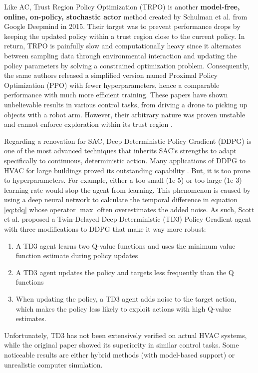 \documentclass[../main.tex]{subfiles}
\begin{document}
Like AC, Trust Region Policy Optimization (TRPO) is another \textbf{model-free, online, on-policy, stochastic actor} method created by Schulman et al. \cite{schulman2015trust} from Google Deepmind in 2015. Their target was to prevent performance drops by keeping the updated policy within a trust region close to the current policy. In return, TRPO is painfully slow and computationally heavy since it alternates between sampling data through environmental interaction and updating the policy parameters by solving a constrained optimization problem. Consequently, the same authors released a simplified version named Proximal Policy Optimization (PPO) \cite{schulman2017proximal} with fewer hyperparameters, hence a comparable performance with much more efficient training. These papers have shown unbelievable results in various control tasks, from driving a drone to picking up objects with a robot arm. However, their arbitrary nature was proven unstable and cannot enforce exploration within its trust region \cite{wang2020truly}.

Regarding a renovation for SAC, Deep Deterministic Policy Gradient (DDPG) \cite{lillicrap2019ddpg} is one of the most advanced techniques that inherits SAC's strengths to adapt specifically to continuous, deterministic action. Many applications of DDPG to HVAC for large buildings proved its outstanding capability \cite{duyan20multiddpg,fu21mpctd3}. But, it is too prone to hyperparameters. For example, either a too-small (1e-5) or too-large (1e-3) learning rate would stop the agent from learning. This phenomenon is caused by using a deep neural network to calculate the temporal difference in equation \ref{eq:tdq} whose operator $\max$ often overestimates the added noise. As such, Scott et al. \cite{td3} proposed a Twin-Delayed Deep Deterministic (TD3) Policy Gradient agent with three modifications to DDPG that make it way more robust:
\begin{enumerate}
    \item A TD3 agent learns two Q-value functions and uses the minimum value function estimate during policy updates
    \item A TD3 agent updates the policy and targets less frequently than the Q functions
    \item When updating the policy, a TD3 agent adds noise to the target action, which makes the policy less likely to exploit actions with high Q-value estimates.
\end{enumerate}
Unfortunately, TD3 has not been extensively verified on actual HVAC systems, while the original paper showed its superiority in similar control tasks. Some noticeable results \cite{fu21mpctd3,manjavacas2024experimental} are either hybrid methods (with model-based support) or unrealistic computer simulation.
\end{document}
